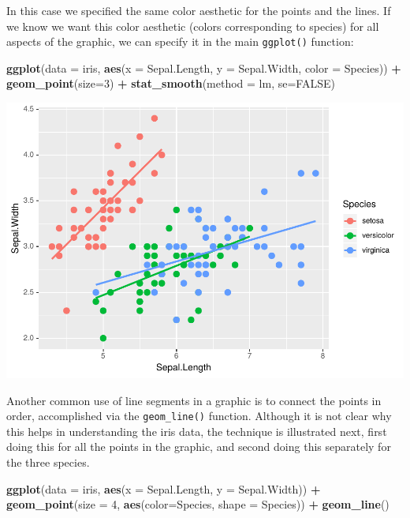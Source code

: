 \documentclass[
]{krantz}
\makeatletter
\newenvironment{Shaded}{\begin{snugshade}}{\end{snugshade}}
\newcommand{\DataTypeTok}[1]{\textcolor[rgb]{0.27,0.27,0.27}{#1}}
\newcommand{\DecValTok}[1]{\textcolor[rgb]{0.06,0.06,0.06}{#1}}
\newcommand{\KeywordTok}[1]{\textcolor[rgb]{0.27,0.27,0.27}{\textbf{#1}}}
\newcommand{\NormalTok}[1]{#1}
\newcommand{\OperatorTok}[1]{\textcolor[rgb]{0.43,0.43,0.43}{\textbf{#1}}}
\newcommand{\OtherTok}[1]{\textcolor[rgb]{0.37,0.37,0.37}{#1}}
\newcommand{\StringTok}[1]{\textcolor[rgb]{0.5,0.5,0.5}{#1}}
\newenvironment{kframe}{%
\medskip{}
\setlength{\fboxsep}{.8em}
 \def\at@end@of@kframe{}%
 \ifinner\ifhmode%
  \def\at@end@of@kframe{\end{minipage}}%
  \begin{minipage}{\columnwidth}%
 \fi\fi%
 \def\FrameCommand##1{\hskip\@totalleftmargin \hskip-\fboxsep
 \colorbox{shadecolor}{##1}\hskip-\fboxsep
     \hskip-\linewidth \hskip-\@totalleftmargin \hskip\columnwidth}%
 \MakeFramed {\advance\hsize-\width
   \@totalleftmargin\z@ \linewidth\hsize
   \@setminipage}}%
 {\par\unskip\endMakeFramed%
 \at@end@of@kframe}
\renewenvironment{Shaded}{\begin{kframe}}{\end{kframe}}
\makeatother
\begin{document}
In this case we specified the same color aesthetic for the points and the lines. If we know we want this color aesthetic (colors corresponding to species) for all aspects of the graphic, we can specify it in the main \texttt{ggplot()} function:

\begin{Shaded}
\begin{Highlighting}[]
\KeywordTok{ggplot}\NormalTok{(}\DataTypeTok{data =}\NormalTok{ iris, }\KeywordTok{aes}\NormalTok{(}\DataTypeTok{x =}\NormalTok{ Sepal.Length, }\DataTypeTok{y =}\NormalTok{ Sepal.Width, }\DataTypeTok{color =}\NormalTok{ Species)) }\OperatorTok{+}\StringTok{ }
\StringTok{    }\KeywordTok{geom\_point}\NormalTok{(}\DataTypeTok{size=}\DecValTok{3}\NormalTok{) }\OperatorTok{+}\StringTok{ }\KeywordTok{stat\_smooth}\NormalTok{(}\DataTypeTok{method =}\NormalTok{ lm, }\DataTypeTok{se=}\OtherTok{FALSE}\NormalTok{)}
\end{Highlighting}
\end{Shaded}

\includegraphics{bookdown_files/figure-latex/unnamed-chunk-64-1.pdf}

Another common use of line segments in a graphic is to connect the points in order, accomplished via the \texttt{geom\_line()} function. Although it is not clear why this helps in understanding the iris data, the technique is illustrated next, first doing this for all the points in the graphic, and second doing this separately for the three species.

\begin{Shaded}
\begin{Highlighting}[]
\KeywordTok{ggplot}\NormalTok{(}\DataTypeTok{data =}\NormalTok{ iris, }\KeywordTok{aes}\NormalTok{(}\DataTypeTok{x =}\NormalTok{ Sepal.Length, }\DataTypeTok{y =}\NormalTok{ Sepal.Width)) }\OperatorTok{+}\StringTok{ }
\StringTok{    }\KeywordTok{geom\_point}\NormalTok{(}\DataTypeTok{size =} \DecValTok{4}\NormalTok{, }\KeywordTok{aes}\NormalTok{(}\DataTypeTok{color=}\NormalTok{Species, }\DataTypeTok{shape =}\NormalTok{ Species)) }\OperatorTok{+}\StringTok{ }
\StringTok{    }\KeywordTok{geom\_line}\NormalTok{()}
\end{Highlighting}
\end{Shaded}
\end{document}
